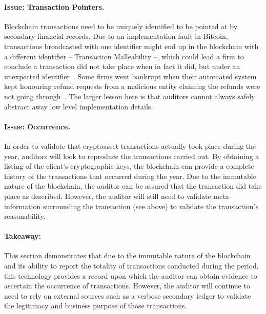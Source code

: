 \paragraph{Issue: Transaction Pointers.} Blockchain transactions need to be uniquely identified to be pointed at by secondary financial records. Due to an implementation fault in Bitcoin, transactions broadcasted with one identifier might end up in the blockchain with a different identifier -- Transaction Malleability --, which could lead a firm to conclude a transaction did not take place when in fact it did, but under an unexpected identifier~\cite{andrychowicz2015malleability}. Some firms went bankrupt when their automated system kept honouring refund requests from a malicious entity claiming the refunds were not going through~\cite{trautman2014virtual,decker2014bitcoin}. The larger lesson here is that auditors cannot always safely abstract away low level implementation details.   

\paragraph{Issue: Occurrence.}  In order to validate that cryptoasset transactions actually took place during the year, auditors will look to reproduce the transactions carried out. By obtaining a listing of the client{'}s cryptographic keys, the blockchain can provide a complete history of the transactions that occurred during the year. Due to the immutable nature of the blockchain, the auditor can be assured that the transaction did take place as described. However, the auditor will still need to validate meta-information surrounding the transaction (see above) to validate the transaction{'}s reasonability. 

\paragraph{Takeaway:} This section demonstrates that due to the immutable nature of the blockchain and its ability to report the totality of transactions conducted during the period, this technology provides a record upon which the auditor can obtain evidence to ascertain the occurrence of transactions. However, the auditor will continue to need to rely on external sources such as a verbose secondary ledger to validate the legitimacy and business purpose of those transactions. 


